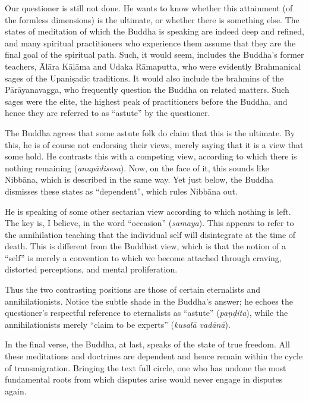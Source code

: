 \documentclass[12pt,openany]{book}%
\begin{document}
Our questioner is still not done. He wants to know whether this attainment (of the formless dimensions) is the ultimate, or whether there is something else. The states of meditation of which the Buddha is speaking are indeed deep and refined, and many spiritual practitioners who experience them assume that they are the final goal of the spiritual path. Such, it would seem, includes the Buddha’s former teachers, \textsanskrit{Ālāra} \textsanskrit{Kālāma} and Udaka \textsanskrit{Rāmaputta}, who were evidently Brahmanical sages of the \textsanskrit{Upaniṣadic} traditions. It would also include the brahmins of the \textsanskrit{Pārāyanavagga}, who frequently question the Buddha on related matters. Such sages were the elite, the highest peak of practitioners before the Buddha, and hence they are referred to as “astute” by the questioner.

The Buddha agrees that some astute folk do claim that this is the ultimate. By this, he is of course not endorsing their views, merely saying that it is a view that some hold. He contrasts this with a competing view, according to which there is nothing remaining (\textit{\textsanskrit{anupādisesa}}). Now, on the face of it, this sounds like \textsanskrit{Nibbāna}, which is described in the same way. Yet just below, the Buddha dismisses these states as “dependent”, which rules \textsanskrit{Nibbāna} out.

He is speaking of some other sectarian view according to which nothing is left. The key is, I believe, in the word “occasion” (\textit{samaya}). This appears to refer to the annihilation teaching that the individual self will disintegrate at the time of death. This is different from the Buddhist view, which is that the notion of a “self” is merely a convention to which we become attached through craving, distorted perceptions, and mental proliferation.

Thus the two contrasting positions are those of certain eternalists and annihilationists. Notice the subtle shade in the Buddha’s answer; he echoes the questioner’s respectful reference to eternalists as “astute” (\textit{\textsanskrit{paṇḍita}}), while the annihilationists merely “claim to be experts” (\textit{\textsanskrit{kusalā} \textsanskrit{vadānā}}).

In the final verse, the Buddha, at last, speaks of the state of true freedom. All these meditations and doctrines are dependent and hence remain within the cycle of transmigration. Bringing the text full circle, one who has undone the most fundamental roots from which disputes arise would never engage in disputes again.
\end{document}
